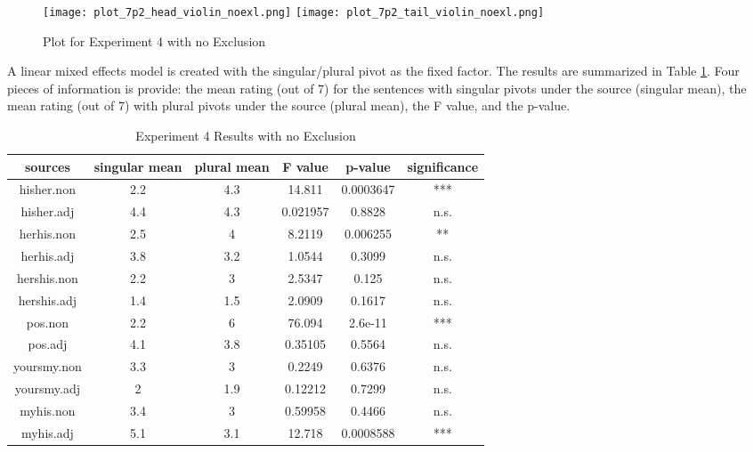 \documentclass[
  11pt          %
  ,letterpaper  %
  ,center       %
  ,noupper      %
  ]{uconnthesis2}
\begin{document}
\begin{figure}[h!] 
\texttt{[image: plot\_7p2\_head\_violin\_noexl.png]} \centering
\texttt{[image: plot\_7p2\_tail\_violin\_noexl.png]} \centering
\caption{Plot for Experiment 4 with no Exclusion}
\label{fig:ch3exp4noexl.violin}
\end{figure}

A linear mixed effects model is created with the singular/plural pivot as the fixed factor. The results are summarized in Table \ref{tab:ch3exp4a}. Four pieces of information is provide: the mean rating (out of 7) for the sentences with singular pivots under the source (singular mean), the mean rating (out of 7) with plural pivots under the source (plural mean), the F value, and the p-value.

\begin{table}[htb!] \small \centering
\resizebox{0.8\textwidth}{!}
{
\begin{tabular}{ | c | c | c | c | c | c |} \hline 
sources		&	singular mean	&	plural mean 	& 	F value		&	p-value		&	significance	\\ \hline
hisher.non		&	2.2			&	4.3			&	14.811 		&	0.0003647	&	***			\\ \hline
hisher.adj		&	4.4 			&	4.3			&	0.021957 		&	0.8828		&	n.s.			\\ \hline
herhis.non		&	2.5	 		&	4			&	8.2119 		&	0.006255		&	**			\\ \hline
herhis.adj		&	3.8 			&	3.2			&	1.0544 		&	0.3099		&	n.s.			\\ \hline
hershis.non	&	2.2 			&	3			&	2.5347  		&	0.125		&	n.s.			\\ \hline
hershis.adj	&	1.4 			&	1.5			&	2.0909 		&	0.1617		&	n.s.			\\ \hline
pos.non		&	2.2 			&	6			&	76.094 		&	2.6e-11		&	***			\\ \hline
pos.adj		&	4.1 			&	3.8			&	0.35105		&	0.5564		&	n.s.			\\ \hline
yoursmy.non	&	3.3 			&	3			&	0.2249 		&	0.6376		&	n.s.			\\ \hline
yoursmy.adj	&	2 			&	1.9 			&	0.12212 		&	0.7299		&	n.s.			\\ \hline
myhis.non		&	3.4 			&	3			&	0.59958 		&	0.4466		&	n.s.			\\ \hline
myhis.adj		&	5.1 			&	3.1			&	12.718 		&	0.0008588	&	***			\\ \hline
\end{tabular}}
\caption{Experiment 4 Results with no Exclusion } \label{tab:ch3exp4a}
\end{table} 
\end{document}
